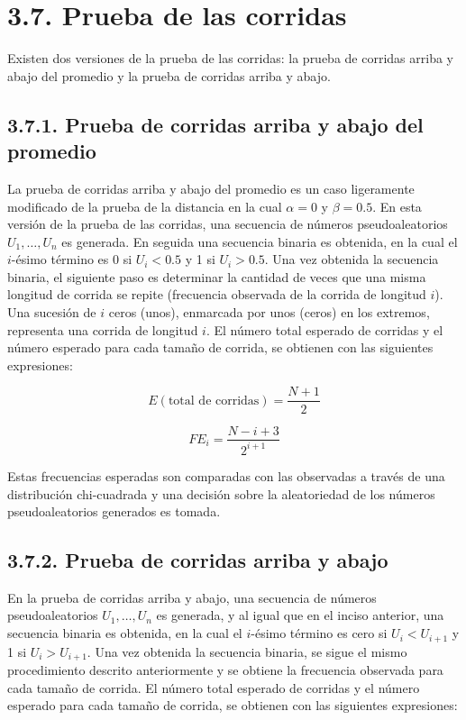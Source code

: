 \documentclass[11pt,letterpaper]{report}
\begin{document}
\section*{3.7. Prueba de las corridas}

Existen dos versiones de la prueba de las corridas: la prueba de
corridas arriba y abajo del promedio y la prueba de corridas arriba y
abajo.

\subsection*{3.7.1. Prueba de corridas arriba y abajo del promedio}

La prueba de corridas arriba y abajo del promedio es un caso ligeramente
modificado de la prueba de la distancia en la cual $\alpha=0$ y
$\beta=0.5$. En esta versión de la prueba de las corridas, una secuencia
de números pseudoaleatorios $U_1,\ldots,U_n$ es generada. En seguida una
secuencia binaria es obtenida, en la cual el $i$-ésimo término es 0 si
$U_i < 0.5$ y 1 si $U_i > 0.5$. Una vez obtenida la secuencia binaria, el
siguiente paso es determinar la cantidad de veces que una misma longitud
de corrida se repite (frecuencia observada de la corrida de longitud
$i$). Una sucesión de $i$ ceros (unos), enmarcada por unos (ceros) en los
extremos, representa una corrida de longitud $i$. El número total
esperado de corridas y el número esperado para cada tamaño de corrida,
se obtienen con las siguientes expresiones:

\begin{equation}
E(\text{total de corridas}) = \frac{N+1}{2}
\end{equation}

\begin{equation}
FE_i = \frac{N-i+3}{2^{i+1}}
\end{equation}

Estas frecuencias esperadas son comparadas con las observadas a través
de una distribución chi-cuadrada y una decisión sobre la aleatoriedad de
los números pseudoaleatorios generados es tomada.

\subsection*{3.7.2. Prueba de corridas arriba y abajo}

En la prueba de corridas arriba y abajo, una secuencia de números
pseudoaleatorios $U_1,\ldots,U_n$ es generada, y al igual que en el
inciso anterior, una secuencia binaria es obtenida, en la cual el
$i$-ésimo término es cero si $U_i < U_{i+1}$ y 1 si $U_i > U_{i+1}$. Una
vez obtenida la secuencia binaria, se sigue el mismo procedimiento
descrito anteriormente y se obtiene la frecuencia observada para cada
tamaño de corrida. El número total esperado de corridas y el número
esperado para cada tamaño de corrida, se obtienen con las siguientes
expresiones:
\end{document}

